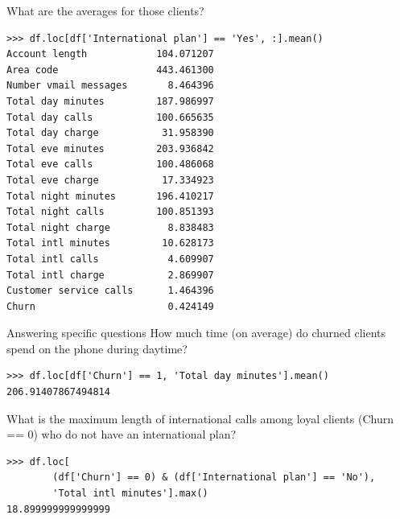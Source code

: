 \documentclass[aspectratio=169,usenames,dvipsnames]{beamer}
\begin{document}
\begin{frame}[fragile]{What are the averages for those clients?}
\begin{lstlisting}
>>> df.loc[df['International plan'] == 'Yes', :].mean()
Account length            104.071207
Area code                 443.461300
Number vmail messages       8.464396
Total day minutes         187.986997
Total day calls           100.665635
Total day charge           31.958390
Total eve minutes         203.936842
Total eve calls           100.486068
Total eve charge           17.334923
Total night minutes       196.410217
Total night calls         100.851393
Total night charge          8.838483
Total intl minutes         10.628173
Total intl calls            4.609907
Total intl charge           2.869907
Customer service calls      1.464396
Churn                       0.424149
\end{lstlisting}
\end{frame}

\begin{frame}[fragile]{Answering specific questions}
How much time (on average) do churned clients spend on the phone during daytime?

\begin{lstlisting}
>>> df.loc[df['Churn'] == 1, 'Total day minutes'].mean()
206.91407867494814
\end{lstlisting}

\pause
What is the maximum length of international calls among loyal clients
(Churn == 0) who do not have an international plan?

\begin{lstlisting}
>>> df.loc[
        (df['Churn'] == 0) & (df['International plan'] == 'No'),
        'Total intl minutes'].max()
18.899999999999999
\end{lstlisting}
\end{frame}



% 
% 
% 
 
\end{document}
